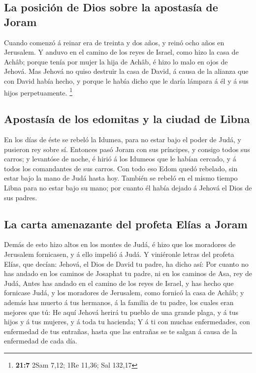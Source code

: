 \hypertarget{la-posiciuxf3n-de-dios-sobre-la-apostasuxeda-de-joram}{%
\subsection{La posición de Dios sobre la apostasía de
Joram}\label{la-posiciuxf3n-de-dios-sobre-la-apostasuxeda-de-joram}}

 Cuando comenzó á reinar era de treinta y dos años, y reinó
ocho años en Jerusalem.  Y anduvo en el camino de los reyes
de Israel, como hizo la casa de Achâb; porque tenía por mujer la hija de
Achâb, é hizo lo malo en ojos de Jehová.  Mas Jehová no
quiso destruir la casa de David, á causa de la alianza que con David
había hecho, y porque le había dicho que le daría lámpara á él y á sus
hijos perpetuamente. \footnote{\textbf{21:7} 2Sam 7,12; 1Re 11,36; Sal
  132,17}

\hypertarget{apostasuxeda-de-los-edomitas-y-la-ciudad-de-libna}{%
\subsection{Apostasía de los edomitas y la ciudad de
Libna}\label{apostasuxeda-de-los-edomitas-y-la-ciudad-de-libna}}

 En los días de éste se rebeló la Idumea, para no estar bajo
el poder de Judá, y pusieron rey sobre sí.  Entonces pasó
Joram con sus príncipes, y consigo todos sus carros; y levantóse de
noche, é hirió á los Idumeos que le habían cercado, y á todos los
comandantes de sus carros.  Con todo eso Edom quedó
rebelado, sin estar bajo la mano de Judá hasta hoy. También se rebeló en
el mismo tiempo Libna para no estar bajo su mano; por cuanto él había
dejado á Jehová el Dios de sus padres.

\hypertarget{la-carta-amenazante-del-profeta-eluxedas-a-joram}{%
\subsection{La carta amenazante del profeta Elías a
Joram}\label{la-carta-amenazante-del-profeta-eluxedas-a-joram}}

 Demás de esto hizo altos en los montes de Judá, é hizo que
los moradores de Jerusalem fornicasen, y á ello impelió á Judá.
 Y viniéronle letras del profeta Elías, que decían: Jehová,
el Dios de David tu padre, ha dicho así: Por cuanto no has andado en los
caminos de Josaphat tu padre, ni en los caminos de Asa, rey de Judá,
 Antes has andado en el camino de los reyes de Israel, y
has hecho que fornicase Judá, y los moradores de Jerusalem, como fornicó
la casa de Achâb; y además has muerto á tus hermanos, á la familia de tu
padre, los cuales eran mejores que tú:  He aquí Jehová
herirá tu pueblo de una grande plaga, y á tus hijos y á tus mujeres, y á
toda tu hacienda;  Y á ti con muchas enfermedades, con
enfermedad de tus entrañas, hasta que las entrañas se te salgan á causa
de la enfermedad de cada día.

